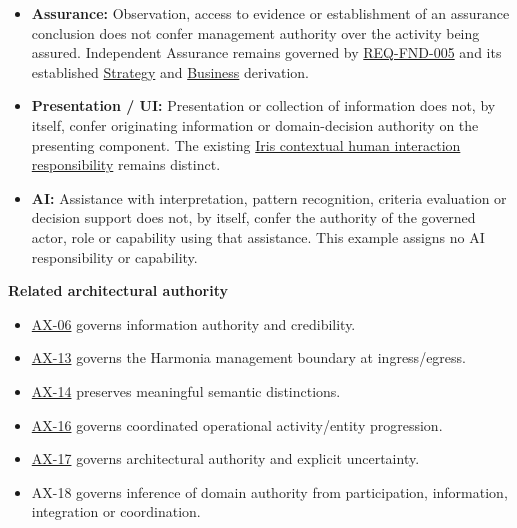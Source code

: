 \begin{itemize}
\item \textbf{Assurance:} Observation, access to evidence or establishment of an
  assurance conclusion does not confer management authority over the activity
  being assured. Independent Assurance remains governed by
  \hyperref[element:bbb7438e78604308abba93afc14f4e2e]{REQ-FND-005}
  and its established
  \href{\detokenize{../../../../../../../../docs/markdown/02-strategy/capability-maps/health-service-assurance-derivation.md}}{Strategy}
  and \href{\detokenize{../../../../../../../../docs/markdown/03-business-architecture/behaviours/health-service-assurance.md}}{Business}
  derivation.

\item \textbf{Presentation / UI:} Presentation or collection of information does not,
  by itself, confer originating information or domain-decision authority on
  the presenting component. The existing
  \href{\detokenize{../../../../../../../../docs/markdown/02-strategy/strategic-views/logical-component-responsibilities.md#component-6-iris-contextual-human-interaction}}{Iris contextual human interaction responsibility}
  remains distinct.

\item \textbf{AI:} Assistance with interpretation, pattern recognition, criteria
  evaluation or decision support does not, by itself, confer the authority of
  the governed actor, role or capability using that assistance. This example
  assigns no AI responsibility or capability.

\end{itemize}


\par\medskip\textbf{Related architectural authority}\par


\begin{itemize}


\item \hyperref[element:952c3b6148ce4fce94b69f99a0c2fec7]{AX-06} governs information authority and credibility.

\item \hyperref[element:b6a55decfeec4f1bb3d7f18534a2ffea]{AX-13} governs the Harmonia management boundary at ingress/egress.

\item \hyperref[element:d3fc6025dc7646d1b2020b51f7a44bfa]{AX-14} preserves meaningful semantic distinctions.

\item \hyperref[element:de7e90f46127455a9ec9ad3b9b48ba54]{AX-16} governs coordinated operational activity/entity progression.

\item \hyperref[element:8882573df7ce43c6bc0f66da0a676139]{AX-17} governs architectural authority and explicit uncertainty.

\item AX-18 governs inference of domain authority from participation, information,
  integration or coordination.

\end{itemize}

